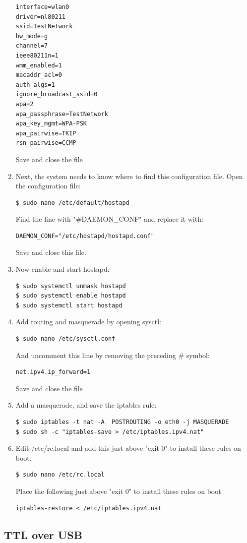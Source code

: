 \begin{enumerate}
\begin{lstlisting}
interface=wlan0
driver=nl80211
ssid=TestNetwork
hw_mode=g
channel=7
ieee80211n=1
wmm_enabled=1
macaddr_acl=0
auth_algs=1
ignore_broadcast_ssid=0
wpa=2
wpa_passphrase=TestNetwork
wpa_key_mgmt=WPA-PSK
wpa_pairwise=TKIP
rsn_pairwise=CCMP
\end{lstlisting}
Save and close the file
\item Next, the system needs to know where to find this configuration file. Open the configuration file:
\begin{lstlisting}
$ sudo nano /etc/default/hostapd
\end{lstlisting}
Find the line with "\#DAEMON\_CONF" and replace it with:
\begin{lstlisting}
DAEMON_CONF="/etc/hostapd/hostapd.conf"
\end{lstlisting}
Save and close this file.
\item Now enable and start hostapd:
\begin{lstlisting}
$ sudo systemctl unmask hostapd
$ sudo systemctl enable hostapd
$ sudo systemctl start hostapd
\end{lstlisting}
\item Add routing and masquerade by opening sysctl:
\begin{lstlisting}
$ sudo nano /etc/sysctl.conf
\end{lstlisting}
And uncomment this line by removing the preceding \# symbol:
\begin{lstlisting}
net.ipv4.ip_forward=1
\end{lstlisting}
Save and close the file
\item Add a masquerade, and save the iptables rule:
\begin{lstlisting}
$ sudo iptables -t nat -A  POSTROUTING -o eth0 -j MASQUERADE
$ sudo sh -c "iptables-save > /etc/iptables.ipv4.nat"
\end{lstlisting}
\item Edit /etc/rc.local and add this just above "exit 0" to install these rules on boot.
\begin{lstlisting}
$ sudo nano /etc/rc.local
\end{lstlisting}
Place the following just above "exit 0" to install these rules on boot
\begin{lstlisting}
iptables-restore < /etc/iptables.ipv4.nat
\end{lstlisting}
\end{enumerate}

\subsection{TTL over USB}

